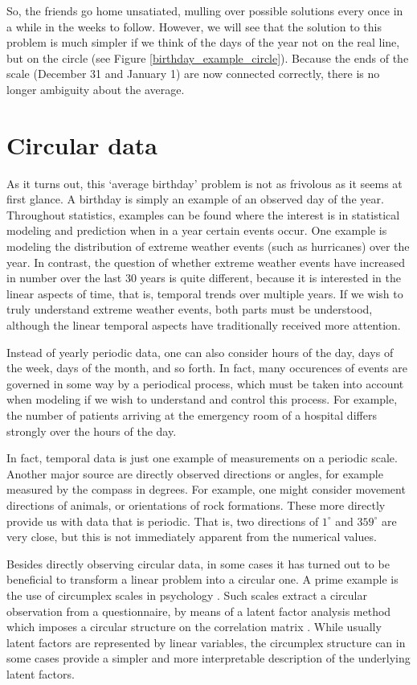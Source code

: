 \documentclass[12pt, a4paper]{book}\usepackage[]{graphicx}\usepackage{xcolor}
\begin{document}
So, the friends go home unsatiated, mulling over possible solutions every once in a while in the weeks to follow. However, we will see that the solution to this problem is much simpler if we think of the days of the year not on the real line, but on the circle (see Figure \ref{birthday_example_circle}). Because the ends of the scale (December 31 and January 1) are now connected correctly, there is no longer ambiguity about the average.


\section*{Circular data}

As it turns out, this `average birthday' problem is not as frivolous as it seems at first glance.  A birthday is simply an example of an observed day of the year. Throughout statistics, examples can be found where the interest is in statistical modeling and prediction when in a year certain events occur. One example is modeling the distribution of extreme weather events (such as hurricanes) over the year. In contrast, the question of whether extreme weather events have increased in number over the last 30 years is quite different, because it is interested in the linear aspects of time, that is, temporal trends over multiple years. If we wish to truly understand extreme weather events, both parts must be understood, although the linear temporal aspects have traditionally received more attention.

Instead of yearly periodic data, one can also consider hours of the day, days of the week, days of the month, and so forth. In fact, many occurences of events are governed in some way by a periodical process, which must be taken into account when modeling if we wish to understand and control this process. For example, the number of patients arriving at the emergency room of a hospital differs strongly over the hours of the day.

In fact, temporal data is just one example of measurements on a periodic scale. Another major source are directly observed directions or angles, for example measured by the compass in degrees. For example, one might consider movement directions of animals, or orientations of rock formations. These more directly provide us with data that is periodic. That is, two directions of $1^\circ$ and $359^\circ$ are very close, but this is not immediately apparent from the numerical values.

Besides directly observing circular data, in some cases it has turned out to be beneficial to transform a linear problem into a circular one. A prime example is the use of circumplex scales in psychology \citep{gurtmancircumplex}. Such scales extract a circular observation from a questionnaire, by means of a latent factor analysis method which imposes a circular structure on the correlation matrix \citep{browne1992circumplex}. While usually latent factors are represented by linear variables, the circumplex structure can in some cases provide a simpler and more interpretable description of the underlying latent factors.
\end{document}
